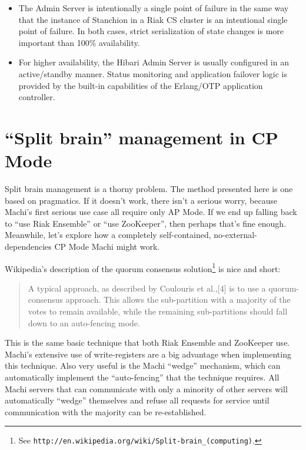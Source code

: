 \documentclass[preprint,10pt]{sigplanconf}
\begin{document}
\begin{itemize}
\item The Admin Server is intentionally a single point of failure in
  the same way that the instance of Stanchion in a Riak CS cluster
  is an intentional single
  point of failure.  In both cases, strict
  serialization of state changes is more important than 100\%
  availability.

\item For higher availability, the Hibari Admin Server is usually
  configured in an active/standby manner.  Status monitoring and
  application failover logic is provided by the built-in capabilities
  of the Erlang/OTP application controller.

\end{itemize}

\section{``Split brain'' management in CP Mode}
\label{sec:split-brain-management}

Split brain management is a thorny problem.  The method presented here
is one based on pragmatics.  If it doesn't work, there isn't a serious
worry, because Machi's first serious use case all require only AP Mode.
If we end up falling back to ``use Riak Ensemble'' or ``use ZooKeeper'',
then perhaps that's
fine enough.  Meanwhile, let's explore how a
completely self-contained, no-external-dependencies
CP Mode Machi might work.

Wikipedia's description of the quorum consensus solution\footnote{See
  {\tt http://en.wikipedia.org/wiki/Split-brain\_(computing)}.} is nice
and short:

\begin{quotation}
A typical approach, as described by Coulouris et al.,[4] is to use a
quorum-consensus approach. This allows the sub-partition with a
majority of the votes to remain available, while the remaining
sub-partitions should fall down to an auto-fencing mode.
\end{quotation}

This is the same basic technique that
both Riak Ensemble and ZooKeeper use.  Machi's
extensive use of write-registers are a big advantage when implementing
this technique.  Also very useful is the Machi ``wedge'' mechanism,
which can automatically implement the ``auto-fencing'' that the
technique requires.  All Machi servers that can communicate with only
a minority of other servers will automatically ``wedge'' themselves
and refuse all requests for service until communication with the
majority can be re-established.
\end{document}

